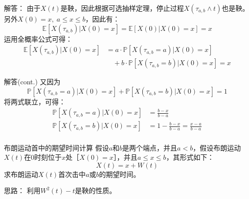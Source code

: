 \documentclass[t]{beamer}
\renewcommand{\Pr}{\mathbb{P}}
\newcommand{\E}{\mathbb{E}}
\begin{document}
      \begin{frame}{解答：}
由于$X(t)$是鞅，因此根据可选抽样定理，停止过程$X(\tau_{a,b}\wedge t)$也是鞅。另外$X(0)=x,\; a\le x\le b$，因此有：
\begin{equation*}
\E\left[X(\tau_{a,b})|X(0)=x \right]=\E\left[X(0)|X(0)=x \right]=x
\end{equation*}
运用全概率公式可得：
\begin{equation*}
	\begin{split}
		\E\left[X(\tau_{a,b})|X(0)=x \right]&=a\cdot\Pr\left[X(\tau_{a,b}=a)|X(0)=x \right]\\
		&\quad +b\cdot\Pr\left[X(\tau_{a,b}=b)|X(0)=x \right]=x
	\end{split}
\end{equation*}
\end{frame}

\begin{frame}{解答(cont.)}
  又因为
\begin{equation*}
\Pr\left[X(\tau_{a,b}=a)|X(0)=x \right]+\Pr\left[X(\tau_{a,b}=b)|X(0)=x \right]=1
\end{equation*}
将两式联立，可得：
\begin{equation*}
\begin{split}
\Pr\left[X(\tau_{a,b}=a)|X(0)=x \right]&=\frac{b-x}{b-a}  \\
\Pr\left[X(\tau_{a,b}=b)|X(0)=x \right]&=1-\frac{b-x}{b-a} =\frac{x-a}{b-a} \\
\end{split}
\end{equation*}
      \end{frame}

      \begin{frame}{布朗运动首中的期望时间计算}
        假设$a$和$b$是两个端点，并且$a<b$，假设布朗运动$X(t)$在0时刻位于$x$处［$X(0)=x$］，并且$a\le x\le b$，其形式如下：
\[X(t)=x+W(t) \]
求布朗运动$X(t)$首次击中$a$或$b$的期望时间。

\begin{block}{思路：}
  利用$W^2(t)-t$是鞅的性质。
\end{block}
      \end{frame}
\end{document}
